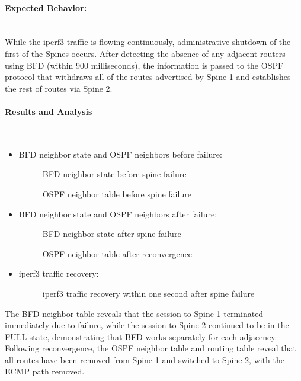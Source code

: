 \paragraph{Expected Behavior:}~\\
While the iperf3 traffic is flowing continuously, administrative shutdown of the first of the Spines occurs. After detecting the absence of any adjacent routers using BFD (within 900 milliseconds), the information is passed to the OSPF protocol that withdraws all of the routes advertised by Spine 1 and establishes the rest of routes via Spine 2.

\paragraph{Results and Analysis}~\\
\begin{itemize}
    \item []BFD neighbor state and OSPF neighbors before failure:
    \begin{figure}[!htbp]
        \centering
        \bfdsucc
        \caption{BFD neighbor state before spine failure}
        \label{fig:bfd-before}
    \end{figure}
    \begin{figure}[!htbp]
        \centering
        \Ospfleaf
        \caption{OSPF neighbor table before spine failure}
        \label{fig:ospf-before}
    \end{figure}
    \item []BFD neighbor state and OSPF neighbors after failure:
    \begin{figure}[!htbp]
        \centering
        \bfdfail
        \caption{BFD neighbor state after spine failure}
        \label{fig:bfd-after}
    \end{figure}
    \begin{figure}[!htbp]
        \centering
        \Ospfleaffailer
        \caption{OSPF neighbor table after reconvergence}
        \label{fig:ospf-after}
    \end{figure}
    \newpage
    \item[]iperf3 traffic recovery:
    \begin{figure}[!htbp]
        \centering
        \Ipsec
        \caption{iperf3 traffic recovery within one second after spine failure}
        \label{fig:iperf-recovery}
    \end{figure}
\end{itemize}
The BFD neighbor table reveals that the session to Spine 1 terminated immediately due to failure, while the session to Spine 2 continued to be in the FULL state, demonstrating that BFD works separately for each adjacency. Following reconvergence, the OSPF neighbor table and routing table reveal that all routes have been removed from Spine 1 and switched to Spine 2, with the ECMP path removed.


